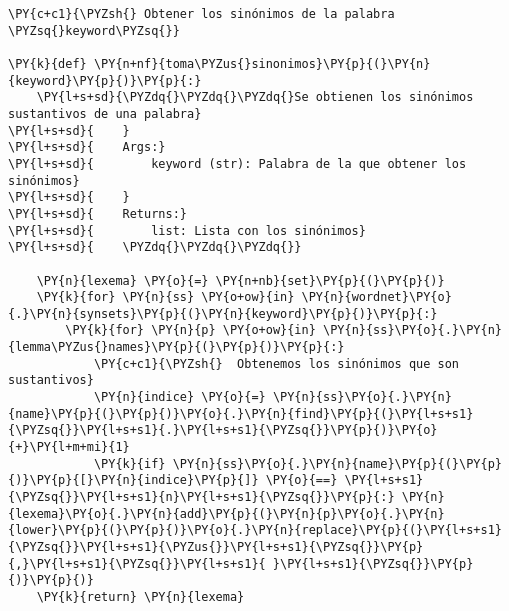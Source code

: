     \begin{tcolorbox}[breakable, size=fbox, boxrule=1pt, pad at break*=1mm,colback=cellbackground, colframe=cellborder]
\begin{Verbatim}[commandchars=\\\{\}]
\PY{c+c1}{\PYZsh{} Obtener los sinónimos de la palabra \PYZsq{}keyword\PYZsq{}}

\PY{k}{def} \PY{n+nf}{toma\PYZus{}sinonimos}\PY{p}{(}\PY{n}{keyword}\PY{p}{)}\PY{p}{:}
    \PY{l+s+sd}{\PYZdq{}\PYZdq{}\PYZdq{}Se obtienen los sinónimos sustantivos de una palabra}
\PY{l+s+sd}{    }
\PY{l+s+sd}{    Args:}
\PY{l+s+sd}{        keyword (str): Palabra de la que obtener los sinónimos}
\PY{l+s+sd}{    }
\PY{l+s+sd}{    Returns:}
\PY{l+s+sd}{        list: Lista con los sinónimos}
\PY{l+s+sd}{    \PYZdq{}\PYZdq{}\PYZdq{}}

    \PY{n}{lexema} \PY{o}{=} \PY{n+nb}{set}\PY{p}{(}\PY{p}{)}
    \PY{k}{for} \PY{n}{ss} \PY{o+ow}{in} \PY{n}{wordnet}\PY{o}{.}\PY{n}{synsets}\PY{p}{(}\PY{n}{keyword}\PY{p}{)}\PY{p}{:}
        \PY{k}{for} \PY{n}{p} \PY{o+ow}{in} \PY{n}{ss}\PY{o}{.}\PY{n}{lemma\PYZus{}names}\PY{p}{(}\PY{p}{)}\PY{p}{:}
            \PY{c+c1}{\PYZsh{}  Obtenemos los sinónimos que son sustantivos}
            \PY{n}{indice} \PY{o}{=} \PY{n}{ss}\PY{o}{.}\PY{n}{name}\PY{p}{(}\PY{p}{)}\PY{o}{.}\PY{n}{find}\PY{p}{(}\PY{l+s+s1}{\PYZsq{}}\PY{l+s+s1}{.}\PY{l+s+s1}{\PYZsq{}}\PY{p}{)}\PY{o}{+}\PY{l+m+mi}{1}
            \PY{k}{if} \PY{n}{ss}\PY{o}{.}\PY{n}{name}\PY{p}{(}\PY{p}{)}\PY{p}{[}\PY{n}{indice}\PY{p}{]} \PY{o}{==} \PY{l+s+s1}{\PYZsq{}}\PY{l+s+s1}{n}\PY{l+s+s1}{\PYZsq{}}\PY{p}{:} \PY{n}{lexema}\PY{o}{.}\PY{n}{add}\PY{p}{(}\PY{n}{p}\PY{o}{.}\PY{n}{lower}\PY{p}{(}\PY{p}{)}\PY{o}{.}\PY{n}{replace}\PY{p}{(}\PY{l+s+s1}{\PYZsq{}}\PY{l+s+s1}{\PYZus{}}\PY{l+s+s1}{\PYZsq{}}\PY{p}{,}\PY{l+s+s1}{\PYZsq{}}\PY{l+s+s1}{ }\PY{l+s+s1}{\PYZsq{}}\PY{p}{)}\PY{p}{)}
    \PY{k}{return} \PY{n}{lexema}   
\end{Verbatim}
\end{tcolorbox}

